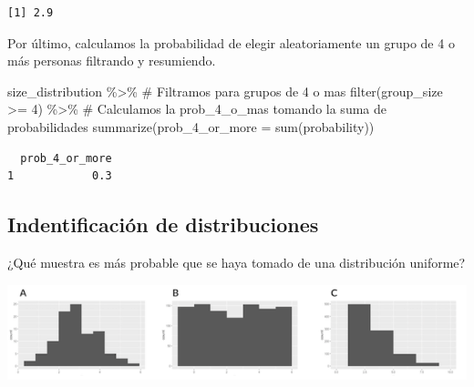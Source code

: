 \documentclass[
  letterpaper,
  DIV=11,
  numbers=noendperiod]{scrreprt}
\newenvironment{Shaded}{\begin{snugshade}}{\end{snugshade}}
\newcommand{\AttributeTok}[1]{\textcolor[rgb]{0.40,0.45,0.13}{#1}}
\newcommand{\CommentTok}[1]{\textcolor[rgb]{0.37,0.37,0.37}{#1}}
\newcommand{\DecValTok}[1]{\textcolor[rgb]{0.68,0.00,0.00}{#1}}
\newcommand{\FunctionTok}[1]{\textcolor[rgb]{0.28,0.35,0.67}{#1}}
\newcommand{\NormalTok}[1]{\textcolor[rgb]{0.00,0.23,0.31}{#1}}
\newcommand{\OtherTok}[1]{\textcolor[rgb]{0.00,0.23,0.31}{#1}}
\newcommand{\SpecialCharTok}[1]{\textcolor[rgb]{0.37,0.37,0.37}{#1}}
\begin{document}
\begin{Shaded}
\end{Shaded}

\begin{verbatim}
[1] 2.9
\end{verbatim}

Por último, calculamos la probabilidad de elegir aleatoriamente un grupo
de 4 o más personas filtrando y resumiendo.

\begin{Shaded}
\begin{Highlighting}[]
\NormalTok{size\_distribution }\SpecialCharTok{\%\textgreater{}\%}
  \CommentTok{\# Filtramos para grupos de 4 o mas }
  \FunctionTok{filter}\NormalTok{(group\_size }\SpecialCharTok{\textgreater{}=} \DecValTok{4}\NormalTok{) }\SpecialCharTok{\%\textgreater{}\%}
  \CommentTok{\# Calculamos la prob\_4\_o\_mas tomando la suma de probabilidades}
  \FunctionTok{summarize}\NormalTok{(}\AttributeTok{prob\_4\_or\_more =} \FunctionTok{sum}\NormalTok{(probability))}
\end{Highlighting}
\end{Shaded}

\begin{verbatim}
  prob_4_or_more
1            0.3
\end{verbatim}

\hypertarget{indentificaciuxf3n-de-distribuciones}{%
\subsection{Indentificación de
distribuciones}\label{indentificaciuxf3n-de-distribuciones}}

¿Qué muestra es más probable que se haya tomado de una distribución
uniforme?

\includegraphics{fig27.png}
\end{document}

